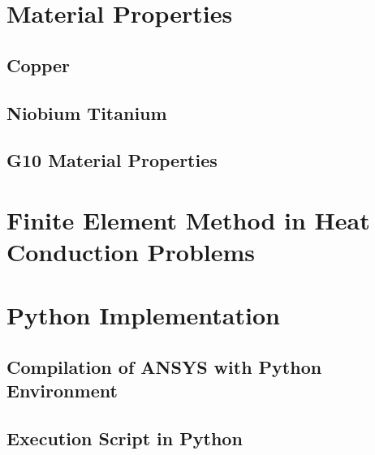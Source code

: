 \documentclass[11pt,a4paper]{report}
\begin{document}
\clearpage
\begin{appendices}

\chapter{Material Properties}
\label{appendix_material_properties_description}
% 

\section{Copper}
\label{appendix:cu_material_properties}
% 

\section{Niobium Titanium}
\label{appendix:nbti_material_properties}
% 

\section{G10 Material Properties}
\label{appendix:g10_material_properties}
% 

\clearpage
\chapter{Finite Element Method in Heat Conduction Problems}
\label{appendix:fem_heat_conduction}
% 

\clearpage
\chapter{Python Implementation}
\section{Compilation of ANSYS with Python Environment}
\label{appendix:python_ansys_compilation}
% 

\section{Execution Script in Python}
\label{appendix:execution_script_python}
% 


\end{appendices}
\end{document}
